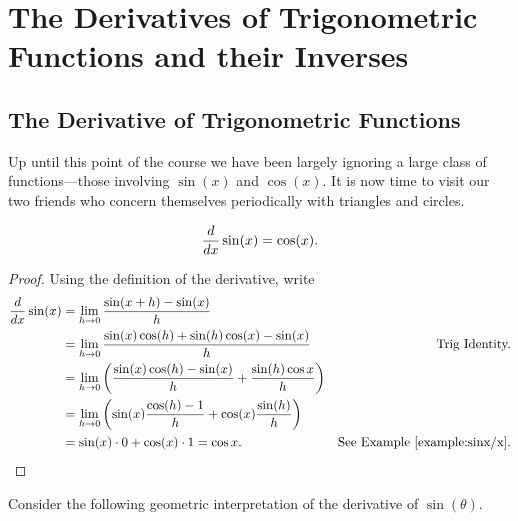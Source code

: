 \chapter{The Derivatives of Trigonometric Functions and their Inverses}



\section{The Derivative of Trigonometric Functions}

Up until this point of the course we have been largely ignoring a large
class of functions---those involving $\sin(x)$ and $\cos(x)$. It is
now time to visit our two friends who concern themselves periodically
with triangles and circles.

\begin{theorem}\label{theorem:deriv sin}
\[
\frac{d}{dx} \sin(x) = \cos(x).
\]
\end{theorem}
\begin{proof}
Using the definition of the derivative, write
\begin{align*}
\frac{d}{dx} \sin(x) &= \lim_{h\to0} \frac{\sin(x+h)-\sin(x)}{h} \\
&= \lim_{h\to0} \frac{\sin(x)\cos(h)+\sin(h)\cos(x)-\sin(x)}{h}  & \text{Trig Identity.}\\
&= \lim_{h\to0} \left(\frac{\sin(x)\cos(h)-\sin(x)}{h} + \frac{\sin(h)\cos{x}}{h} \right)\\
&=\lim_{h\to0} \left(\sin (x)\frac{\cos(h) - 1}{h}+\cos(x)\frac{\sin(h)}{h}\right) \\
&=\sin(x) \cdot 0 + \cos(x) \cdot 1 = \cos x. & \text{See Example~\ref{example:sinx/x}.}
\end{align*}
\end{proof}

Consider the following geometric interpretation of the derivative of
$\sin(\theta)$.  


